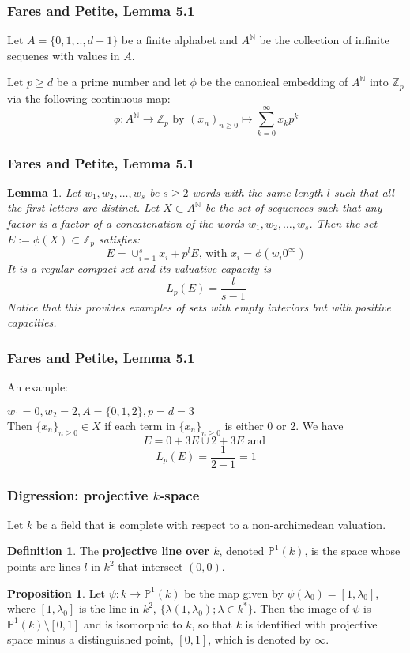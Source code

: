 \documentclass{beamer}
\theoremstyle{definition}
\newtheorem*{proposition*}{Proposition}
\newtheorem*{lemma*}{Lemma}
\newtheorem*{definition*}{Definition}
\begin{document}
\begin{frame}
\frametitle{Fares and Petite, Lemma 5.1}
Let $A=\{0,1,..,d-1\}$ be a finite alphabet and $A^{\mathbb{N}}$ be the collection of infinite sequenes with values in $A$. 
\parskip=20pt

Let $p \geq d$ be a prime number and let $\phi$ be the canonical embedding of $A^\mathbb{N}$ into $\mathbb{Z}_p$ via the following continuous  map: \[ \phi: A^{\mathbb{N}} \rightarrow \mathbb{Z}_p \text{ by } (x_n)_{n\geq0} \mapsto \sum_{k=0}^\infty x_kp^k\]
\end{frame}

\begin{frame}
\frametitle{Fares and Petite, Lemma 5.1}
\begin{lemma*} \textit{Let $w_1,w_2,\ldots,w_s$ be $s\geq 2$ words with the same length $l$ such that all the first letters are distinct. Let $X \subset A^{\mathbb{N}}$ be the set of sequences such that any factor is a factor of a concatenation of the words $w_1,w_2,\ldots,w_s$. Then the set $E := \phi(X) \subset \mathbb{Z}_p$ satisfies: \[E=\cup_{i=1}^s x_i +p^l E \text{,   with } x_i=\phi(w_i0^\infty)\]
It is a regular compact set and its valuative capacity is \[L_p(E) = \frac{l}{s-1}\] Notice that this provides examples of sets with empty interiors but with positive capacities.}
\end{lemma*}
\end{frame}

\begin{frame}
\frametitle{Fares and Petite, Lemma 5.1}
An example:\parskip=20pt


	$w_1=0, w_2=2,  A=\{0,1,2\}, p=d=3$\\
	Then $\{x_n\}_{n\geq0} \in X$ if each term in  $\{x_n\}_{n\geq0}$ is either $0$ or $2$. We have \[E=0 + 3E \cup 2 + 3E \text{ and }\]  \[L_p(E) = \frac{1}{2-1} =1\] 

\end{frame}

\begin{frame}
\frametitle{Digression: projective $k$-space}
 Let $k$ be a field that is complete with respect to a non-archimedean valuation.

\begin{definition*} The \textbf{projective line over $k$}, denoted $\mathbb{P}^1(k)$, is the space whose points are lines $l$ in $k^2$ that intersect $(0,0)$.%
\end{definition*}


\begin{proposition*} Let $\psi: k \rightarrow \mathbb{P}^1(k)$ be the map given by $\psi(\lambda_0) = [1, \lambda_0]$, where $ [1, \lambda_0]$ is the line in $k^2$, $\{\lambda(1, \lambda_0); \lambda \in k^*\}$. Then the image of $\psi$ is $\mathbb{P}^1(k) \setminus [0,1]$ and is isomorphic to $k$, so that $k$ is identified with projective space minus a distinguished point, $[0,1]$, which is denoted by $\infty$.  
\end{proposition*}
\end{frame}
\end{document}
